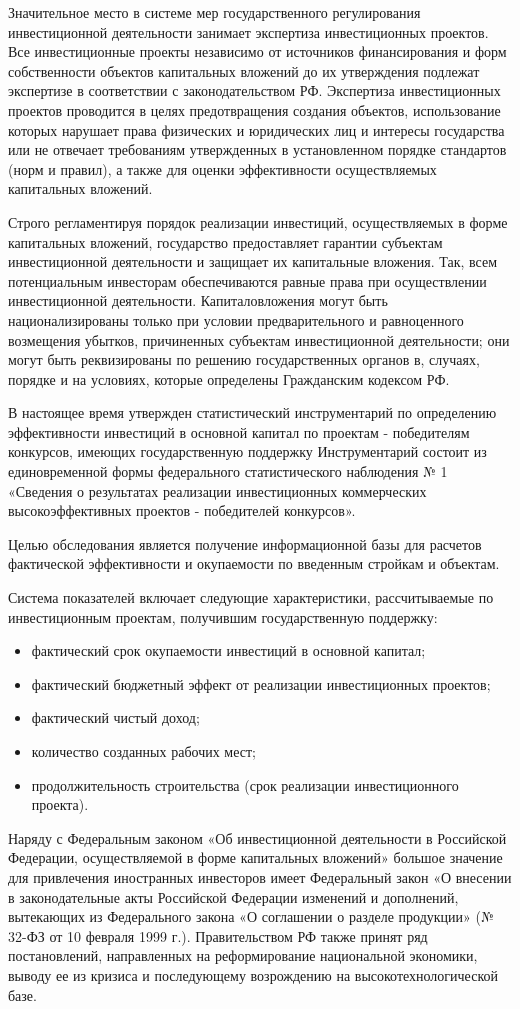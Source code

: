 Значительное место в системе мер государственного регулирования инвестиционной деятельности занимает экспертиза инвестиционных проектов. Все инвестиционные проекты независимо от источников финансирования и форм собственности объектов капитальных вложений до их утверждения подлежат экспертизе в соответствии с законодательством РФ. Экспертиза инвестиционных проектов проводится в целях предотвращения создания объектов, использование которых нарушает права физических и юридических лиц и интересы государства или не отвечает требованиям утвержденных в установленном порядке стандартов (норм и правил), а также для оценки эффективности осуществляемых капитальных вложений.

Строго регламентируя порядок реализации инвестиций, осуществляемых в форме капитальных вложений, государство предоставляет гарантии субъектам инвестиционной деятельности и защищает их капитальные вложения. Так, всем потенциальным инвесторам обеспечиваются равные права при осуществлении инвестиционной деятельности. Капиталовложения могут быть национализированы только при условии предварительного и равноценного возмещения убытков, причиненных субъектам инвестиционной деятельности; они могут быть реквизированы по решению государственных органов в, случаях, порядке и на условиях, которые определены Гражданским кодексом РФ.

В настоящее время утвержден статистический инструментарий по определению эффективности инвестиций в основной капитал по проектам - победителям конкурсов, имеющих государственную поддержку Инструментарий состоит из единовременной формы федерального статистического наблюдения № 1 «Сведения о результатах реализации инвестиционных коммерческих высокоэффективных проектов - победителей конкурсов».

Целью обследования является получение информационной базы для расчетов фактической эффективности и окупаемости по введенным стройкам и объектам.

Система показателей включает следующие характеристики, рассчитываемые по инвестиционным проектам, получившим государственную поддержку:
\begin{itemize}
	\item фактический срок окупаемости инвестиций в основной капитал;
\item фактический бюджетный эффект от реализации инвестиционных проектов;
\item фактический чистый доход;
\item количество созданных рабочих мест;
\item продолжительность строительства (срок реализации инвестиционного проекта).
\end{itemize}
Наряду с Федеральным законом «Об инвестиционной деятельности в Российской Федерации, осуществляемой в форме капитальных вложений» большое значение для привлечения иностранных инвесторов имеет Федеральный закон «О внесении в законодательные акты Российской Федерации изменений и дополнений, вытекающих из Федерального закона «О соглашении о разделе продукции» (№ 32-ФЗ от 10 февраля 1999 г.). Правительством РФ также принят ряд постановлений, направленных на реформирование национальной экономики, выводу ее из кризиса и последующему возрождению на высокотехнологической базе.

